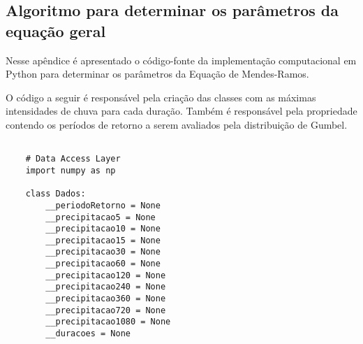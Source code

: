 
\begin{apendicesenv}

\partapendices

\chapter{Algoritmo para determinar os parâmetros da equação geral}

Nesse apêndice é apresentado o código-fonte da implementação computacional em Python para determinar os parâmetros da Equação de Mendes-Ramos.

O código a seguir é responsável pela criação das classes com as máximas intensidades de chuva para cada duração. Também é responsável pela propriedade contendo os períodos de retorno a serem avaliados pela distribuição de Gumbel.

\begin{verbatim}
  
    # Data Access Layer
    import numpy as np
    
    class Dados:
        __periodoRetorno = None
        __precipitacao5 = None
        __precipitacao10 = None
        __precipitacao15 = None
        __precipitacao30 = None
        __precipitacao60 = None
        __precipitacao120 = None
        __precipitacao240 = None
        __precipitacao360 = None
        __precipitacao720 = None
        __precipitacao1080 = None
        __duracoes = None
    

\end{verbatim}
\end{apendicesenv}
